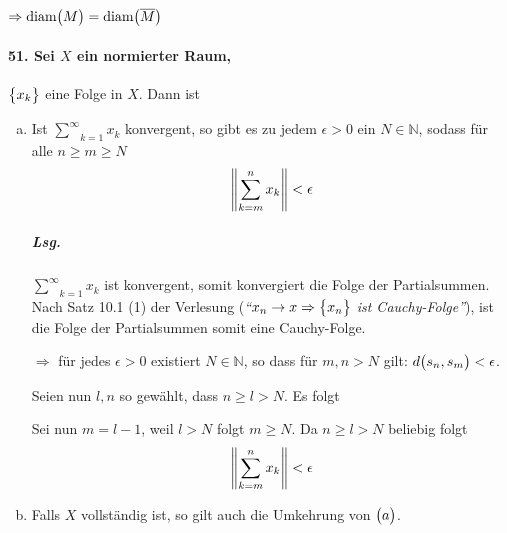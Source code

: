 \documentclass{scrreprt}
\newcommand\diam{\text{diam}}
\begin{document}
$\Rightarrow \diam\qty\big(M) = \diam\qty\big(\overline{M})$

\newpage
\paragraph{51. Sei $X$ ein normierter Raum,} $\qty\big{x_k}$ eine Folge in $X$.
Dann ist
\begin{enumerate}[(a)]
\item Ist $\underset{k = 1}{\overset{\infty}{\sum}} x_k$ konvergent, so gibt
  es zu jedem $\epsilon > 0$ ein $N \in \mathbb{N}$, sodass für alle
  $n \geq m \geq N$
  \[
    \norm{\sum_{k = m}^n x_k} < \epsilon
  \]

  \subparagraph{Lsg.} $\underset{k = 1}{\overset{\infty}{\sum}} x_k$ ist
  konvergent, somit konvergiert die Folge der Partialsummen.
  Nach Satz 10.1 (1) der Verlesung (\emph{``$x_n \to x \Rightarrow \qty\big{x_n}$
    ist Cauchy-Folge''}), ist die Folge der Partialsummen somit eine
  Cauchy-Folge.

  $\Rightarrow$ für jedes $\epsilon > 0$ existiert $N \in \mathbb{N}$, so dass
  für $m, n > N$ gilt: $d\qty\big(s_n, s_m) < \epsilon$.

  Seien nun $l, n$ so gewählt, dass $n \geq l > N$.
  Es folgt
  Sei nun $m = l - 1$, weil $l > N$ folgt $m \geq N$.
  Da $n \geq l > N$ beliebig folgt
  \[
    \norm{\sum_{k = m}^n x_k} < \epsilon
  \]

\item Falls $X$ vollständig ist, so gilt auch die Umkehrung von $\qty\big(a)$.
\end{enumerate}
\end{document}
